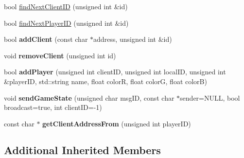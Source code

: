 \begin{DoxyCompactItemize}
\item 
bool \hyperlink{class_state_server_afcde4aa297197e9f2840d24612501b5a}{find\-Next\-Client\-I\-D} (unsigned int \&id)
\item 
bool \hyperlink{class_state_server_a23120a56bdaa4d5e9d555b05e6ba1e8e}{find\-Next\-Player\-I\-D} (unsigned int \&id)
\item 
\hypertarget{class_state_server_a4f6675bef8d34e3e3ffbe3e71e16732e}{bool {\bfseries add\-Client} (const char $\ast$address, unsigned int \&id)}\label{class_state_server_a4f6675bef8d34e3e3ffbe3e71e16732e}

\item 
\hypertarget{class_state_server_aa1feeeb495d9bf60f5750323e839c02d}{void {\bfseries remove\-Client} (unsigned int id)}\label{class_state_server_aa1feeeb495d9bf60f5750323e839c02d}

\item 
\hypertarget{class_state_server_a204e3b252a6b6f50015b598e9beb1b09}{bool {\bfseries add\-Player} (unsigned int client\-I\-D, unsigned int local\-I\-D, unsigned int \&player\-I\-D, std\-::string name, float color\-R, float color\-G, float color\-B)}\label{class_state_server_a204e3b252a6b6f50015b598e9beb1b09}

\item 
\hypertarget{class_state_server_a7d80660aa2ef7ab52ce8c86752abf145}{void {\bfseries send\-Game\-State} (unsigned char msg\-I\-D, const char $\ast$sender=N\-U\-L\-L, bool broadcast=true, int client\-I\-D=-\/1)}\label{class_state_server_a7d80660aa2ef7ab52ce8c86752abf145}

\item 
\hypertarget{class_state_server_a38e2d8121f6df0cde34f459cee2f6617}{const char $\ast$ {\bfseries get\-Client\-Address\-From} (unsigned int player\-I\-D)}\label{class_state_server_a38e2d8121f6df0cde34f459cee2f6617}

\end{DoxyCompactItemize}
\subsection*{Additional Inherited Members}


